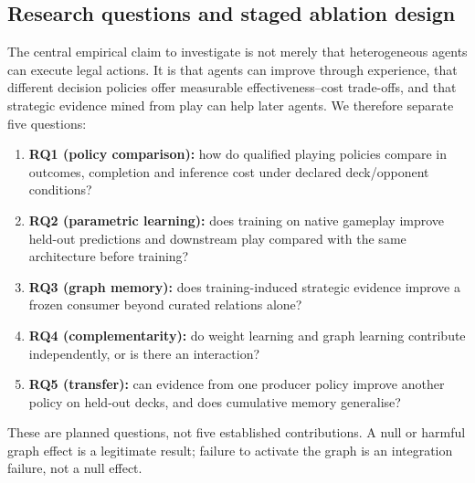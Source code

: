 \documentclass[11pt,a4paper]{article}
\theoremstyle{definition}
\theoremstyle{plain}
\begin{document}
\subsection{Research questions and staged ablation design}
\label{sec:learning-study}

The central empirical claim to investigate is not merely that heterogeneous
agents can execute legal actions. It is that agents can improve through
experience, that different decision policies offer measurable
effectiveness--cost trade-offs, and that strategic evidence mined from play
can help later agents. We therefore separate five questions:
\begin{enumerate}[leftmargin=1.6em,itemsep=3pt]
  \item \textbf{RQ1 (policy comparison):} how do qualified playing policies
  compare in outcomes, completion and inference cost under declared
  deck/opponent conditions?
  \item \textbf{RQ2 (parametric learning):} does training on native gameplay
  improve held-out predictions and downstream play compared with the same
  architecture before training?
  \item \textbf{RQ3 (graph memory):} does training-induced strategic evidence
  improve a frozen consumer beyond curated relations alone?
  \item \textbf{RQ4 (complementarity):} do weight learning and graph learning
  contribute independently, or is there an interaction?
  \item \textbf{RQ5 (transfer):} can evidence from one producer policy improve
  another policy on held-out decks, and does cumulative memory generalise?
\end{enumerate}
These are planned questions, not five established contributions. A null or
harmful graph effect is a legitimate result; failure to activate the graph is
an integration failure, not a null effect.
\end{document}
